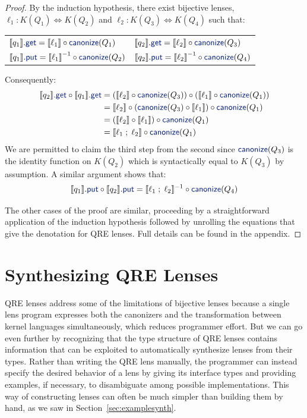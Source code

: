 \documentclass[acmsmall,review,anonymous]{acmart}
\newcommand{\kw}[1]{\textcolor{dkblue}{\ensuremath{\mathsf{#1}}}}
\newcommand{\canonize}{\ensuremath{\kw{canonize}}}
\newcommand{\get}{\ensuremath{\kw{get}}}
\newcommand{\lput}{\ensuremath{\kw{put}}}
\begin{document}
\begin{proof}
By the induction hypothesis, there exist bijective lenses,
$\ell_1 : K(Q_1) \Leftrightarrow K(Q_2)$ and $\ell_2 : K(Q_3) \Leftrightarrow
K(Q_4)$ such that:
\begin{center}
\begin{tabular}{l l}
$\llbracket q_1 \rrbracket.\get = \llbracket \ell_1 \rrbracket \circ
\canonize(Q_1)$ & $\llbracket q_2 \rrbracket.\get = \llbracket \ell_2
\rrbracket \circ \canonize(Q_3)$ \\
$\llbracket q_1 \rrbracket.\lput = {\llbracket \ell_1 \rrbracket}^{-1} \circ
\canonize(Q_2)$ & $\llbracket q_2 \rrbracket.\lput = {\llbracket \ell_2
\rrbracket}^{-1} \circ \canonize(Q_4)$
\end{tabular}
\end{center}
%
Consequently:
\begin{align*}
\llbracket q_2 \rrbracket.\get \circ \llbracket q_1 \rrbracket.\get &=
(\llbracket \ell_2 \rrbracket \circ \canonize(Q_3)) \circ (\llbracket \ell_1
\rrbracket \circ \canonize(Q_1))\\
&= \llbracket \ell_2 \rrbracket \circ (\canonize(Q_3) \circ \llbracket \ell_1
\rrbracket) \circ \canonize(Q_1)\\
&= (\llbracket \ell_2 \rrbracket \circ \llbracket \ell_1 \rrbracket) \circ
\canonize(Q_1)\\
&= \llbracket \ell_1 \; ; \; \ell_2 \rrbracket \circ \canonize(Q_1)
\end{align*}
We are permitted to claim the third step from the second since
$\canonize(Q_3)$ is the identity function on $K(Q_2)$ which is
syntactically equal to $K(Q_3)$ by assumption. A similar argument shows that:
$$\llbracket q_1 \rrbracket.\lput \circ \llbracket q_2 \rrbracket.\lput =
\llbracket \ell_1 \; ; \; \ell_2 \rrbracket^{-1} \circ
\canonize(Q_4)$$

The other cases of the proof are similar, proceeding by a straightforward
application of the induction hypothesis followed by unrolling the equations
that give the denotation for QRE lenses.  Full details can be found in the
appendix.
\end{proof}

\section{Synthesizing QRE Lenses}
\label{synth}

QRE lenses address some of the limitations of bijective lenses because a single
lens program expresses both the canonizers and the transformation between kernel
languages simultaneously, which reduces programmer effort.  But we can go even
further by recognizing that the type structure of QRE lenses contains
information that can be exploited to automatically synthesize lenses from their
types.  Rather than writing the QRE lens manually, the programmer can instead
specify the desired behavior of a lens by giving its interface types and
providing examples, if necessary, to disambiguate among possible
implementations.  This way of constructing lenses can often be much simpler
than building them by hand, as we saw in Section~\ref{sec:examplesynth}.
\end{document}
